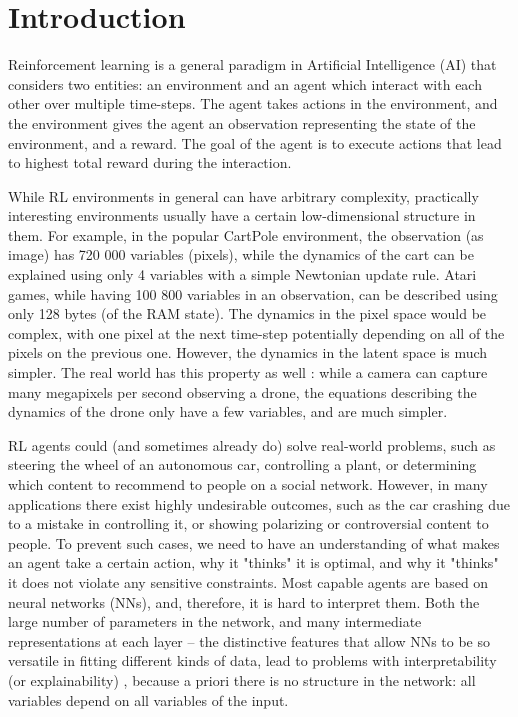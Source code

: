 \documentclass[a4paper,11pt,oneside]{report}
\begin{document}
\maketoc

\chapter{Introduction}
\label{ch:intro}

Reinforcement learning is a general paradigm in Artificial Intelligence (AI) that considers two entities: an environment and an agent which interact with each other over multiple time-steps. The agent takes actions in the environment, and the environment gives the agent an observation representing the state of the environment, and a reward. The goal of the agent is to execute actions that lead to highest total reward during the interaction.

While RL environments in general can have arbitrary complexity, practically interesting environments usually have a certain low-dimensional structure in them. For example, in the popular CartPole environment, the observation (as image) has 720 000 variables (pixels), while the dynamics of the cart can be explained using only 4 variables with a simple Newtonian update rule. Atari games, while having 100 800 variables in an observation, can be described using only 128 bytes (of the RAM state). The dynamics in the pixel space would be complex, with one pixel at the next time-step potentially depending on all of the pixels on the previous one. However, the dynamics in the latent space is much simpler. The real world has this property as well \cite{Hamming1980}: while a camera can capture many megapixels per second observing a drone, the equations describing the dynamics of the drone only have a few variables, and are much simpler.


RL agents could (and sometimes already do) solve real-world problems, such as steering the wheel of an autonomous car, controlling a plant, or determining which content to recommend to people on a social network. However, in many applications there exist highly undesirable outcomes, such as the car crashing due to a mistake in controlling it, or showing polarizing or controversial content to people. To prevent such cases, we need to have an understanding of what makes an agent take a certain action, why it "thinks" it is optimal, and why it "thinks" it does not violate any sensitive constraints. Most capable agents are based on neural networks (NNs), and, therefore, it is hard to interpret them. Both the large number of parameters in the network, and many intermediate representations at each layer -- the distinctive features that allow NNs to be so versatile in fitting different kinds of data, lead to problems with interpretability (or explainability) \cite{Lipton}, because a priori there is no structure in the network: all variables depend on all variables of the input.
\end{document}

